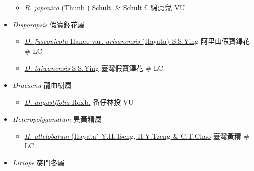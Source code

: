 \begin{itemize}
  \begin{itemize}
        \item[] \href{http://www.theplantlist.org/tpl1.1/search?q=Barnardia+japonica}{\textit{B. japonica} (Thunb.) Schult. \& Schult.f.}   綿棗兒   VU
  \end{itemize}
 \item[] \textit{Disporopsis} 假寶鐸花屬
                                
  \begin{itemize}
        \item[] \href{http://www.theplantlist.org/tpl1.1/search?q=Disporopsis+fuscopicota+var.+arisanensis}{\textit{D. fuscopicota} Hance var. \textit{arisanensis} (Hayata) S.S.Ying}   阿里山假寶鐸花  \# LC
        \item[] \href{http://www.theplantlist.org/tpl1.1/search?q=Disporopsis+taiwanensis}{\textit{D. taiwanensis} S.S.Ying}   臺灣假寶鐸花  \# LC
  \end{itemize}
 \item[] \textit{Dracaena} 龍血樹屬
                                
  \begin{itemize}
        \item[] \href{http://www.theplantlist.org/tpl1.1/search?q=Dracaena+angustifolia}{\textit{D. angustifolia} Roxb.}   番仔林投   VU
  \end{itemize}
 \item[] \textit{Heteropolygonatum} 異黃精屬
                                
  \begin{itemize}
        \item[] \href{http://www.theplantlist.org/tpl1.1/search?q=Heteropolygonatum+altelobatum}{\textit{H. altelobatum} (Hayata) Y.H.Tseng, H.Y.Tzeng \& C.T.Chao}   臺灣黃精  \# LC
  \end{itemize}
 \item[] \textit{Liriope} 麥門冬屬
                                

\end{itemize}
